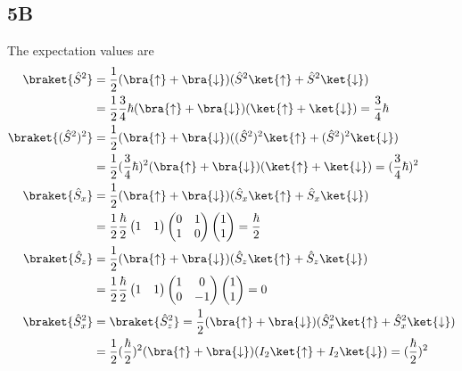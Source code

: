 \subsection*{5B}
The expectation values are
\begin{equation}
    \begin{split}
        \braket{\hat{S}^2} 
        &= \frac{1}{2}(\bra{\uparrow}+\bra{\downarrow})(\hat{S}^2\ket{\uparrow}+\hat{S}^2\ket{\downarrow}) \\
        &= \frac{1}{2}\frac{3}{4}\hbar(\bra{\uparrow}+\bra{\downarrow})(\ket{\uparrow}+\ket{\downarrow}) = \frac{3}{4}\hbar\\
        \braket{(\hat{S}^2)^2}
        &= \frac{1}{2}(\bra{\uparrow}+\bra{\downarrow})((\hat{S}^2)^2\ket{\uparrow}+(\hat{S}^2)^2\ket{\downarrow})\\
        &= \frac{1}{2}(\frac{3}{4}\hbar)^2(\bra{\uparrow}+\bra{\downarrow})(\ket{\uparrow}+\ket{\downarrow}) = (\frac{3}{4}\hbar)^2\\
        \braket{\hat{S}_x} 
        &= \frac{1}{2}(\bra{\uparrow}+\bra{\downarrow})(\hat{S}_x\ket{\uparrow}+\hat{S}_x\ket{\downarrow})\\
        &=\frac{1}{2}\frac{\hbar}{2}
        \begin{pmatrix}
            1 & 1
        \end{pmatrix}
        \begin{pmatrix}
            0 & 1\\
            1 & 0
        \end{pmatrix}
        \begin{pmatrix}
            1\\1
        \end{pmatrix} = \frac{\hbar}{2}\\
        \braket{\hat{S}_z}
        &= \frac{1}{2}(\bra{\uparrow}+\bra{\downarrow})(\hat{S}_z\ket{\uparrow}+\hat{S}_z\ket{\downarrow})\\
        &=\frac{1}{2}\frac{\hbar}{2}
        \begin{pmatrix}
            1 & 1
        \end{pmatrix}
        \begin{pmatrix}
            1 & 0\\
            0 & -1
        \end{pmatrix}
        \begin{pmatrix}
            1\\1
        \end{pmatrix} = 0\\
        \braket{\hat{S}_x^2}
        &= \braket{\hat{S}_z^2} = \frac{1}{2}(\bra{\uparrow}+\bra{\downarrow})(\hat{S}_x^2\ket{\uparrow}+\hat{S}_x^2\ket{\downarrow})\\
        &= \frac{1}{2}(\frac{\hbar}{2})^2(\bra{\uparrow}+\bra{\downarrow})(I_2\ket{\uparrow}+I_2\ket{\downarrow}) = (\frac{\hbar}{2})^2
    \end{split}
\end{equation}
